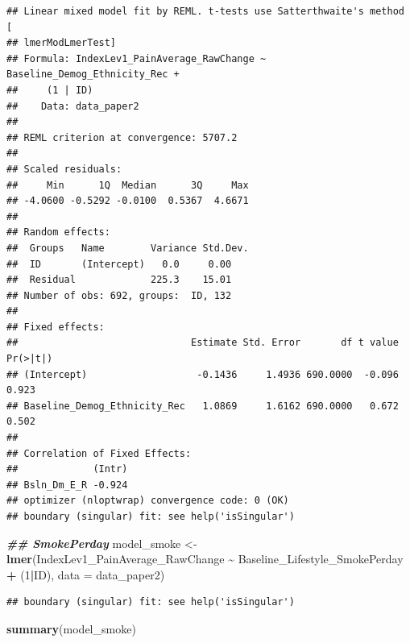 \documentclass[
  12pt,
]{article}
\newenvironment{Shaded}{\begin{snugshade}}{\end{snugshade}}
\newcommand{\AttributeTok}[1]{\textcolor[rgb]{0.13,0.29,0.53}{#1}}
\newcommand{\DecValTok}[1]{\textcolor[rgb]{0.00,0.00,0.81}{#1}}
\newcommand{\DocumentationTok}[1]{\textcolor[rgb]{0.56,0.35,0.01}{\textbf{\textit{#1}}}}
\newcommand{\FunctionTok}[1]{\textcolor[rgb]{0.13,0.29,0.53}{\textbf{#1}}}
\newcommand{\NormalTok}[1]{#1}
\newcommand{\OtherTok}[1]{\textcolor[rgb]{0.56,0.35,0.01}{#1}}
\newcommand{\SpecialCharTok}[1]{\textcolor[rgb]{0.81,0.36,0.00}{\textbf{#1}}}
\begin{document}
\begin{verbatim}
## Linear mixed model fit by REML. t-tests use Satterthwaite's method [
## lmerModLmerTest]
## Formula: IndexLev1_PainAverage_RawChange ~ Baseline_Demog_Ethnicity_Rec +  
##     (1 | ID)
##    Data: data_paper2
## 
## REML criterion at convergence: 5707.2
## 
## Scaled residuals: 
##     Min      1Q  Median      3Q     Max 
## -4.0600 -0.5292 -0.0100  0.5367  4.6671 
## 
## Random effects:
##  Groups   Name        Variance Std.Dev.
##  ID       (Intercept)   0.0     0.00   
##  Residual             225.3    15.01   
## Number of obs: 692, groups:  ID, 132
## 
## Fixed effects:
##                              Estimate Std. Error       df t value Pr(>|t|)
## (Intercept)                   -0.1436     1.4936 690.0000  -0.096    0.923
## Baseline_Demog_Ethnicity_Rec   1.0869     1.6162 690.0000   0.672    0.502
## 
## Correlation of Fixed Effects:
##             (Intr)
## Bsln_Dm_E_R -0.924
## optimizer (nloptwrap) convergence code: 0 (OK)
## boundary (singular) fit: see help('isSingular')
\end{verbatim}

\begin{Shaded}
\begin{Highlighting}[]
\DocumentationTok{\#\# SmokePerday}
\NormalTok{model\_smoke }\OtherTok{\textless{}{-}} \FunctionTok{lmer}\NormalTok{(IndexLev1\_PainAverage\_RawChange }\SpecialCharTok{\textasciitilde{}}\NormalTok{ Baseline\_Lifestyle\_SmokePerday }\SpecialCharTok{+}\NormalTok{ (}\DecValTok{1}\SpecialCharTok{|}\NormalTok{ID), }\AttributeTok{data =}\NormalTok{ data\_paper2)}
\end{Highlighting}
\end{Shaded}

\begin{verbatim}
## boundary (singular) fit: see help('isSingular')
\end{verbatim}

\begin{Shaded}
\begin{Highlighting}[]
\FunctionTok{summary}\NormalTok{(model\_smoke)}
\end{Highlighting}
\end{Shaded}
\end{document}
